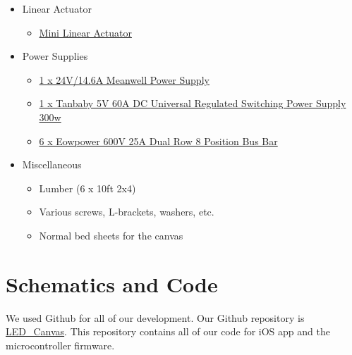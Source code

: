 \documentclass[11pt]{IEEEtran}
\begin{document}
\begin{itemize}
\item Linear Actuator
  \begin{itemize}
  \item \href{https://openbuildspartstore.com/micro-limit-switch-kit/}{Mini Linear Actuator}
  \end{itemize}

\item Power Supplies
  \begin{itemize}
  \item \href{https://openbuildspartstore.com/24v-14-6a-meanwell-power-supply/}{1 x 24V/14.6A Meanwell Power Supply}
  \item \href{https://www.amazon.com/Tanbaby-Universal-Regulated-Switching-Computer/dp/B017YEOAPA}{1 x Tanbaby 5V 60A DC Universal Regulated Switching Power Supply 300w}
  \item \href{https://www.amazon.com/gp/product/B06XKFCTSM/ref=oh_aui_detailpage_o05_s00?ie=UTF8&psc=1}{6 x Eowpower 600V 25A Dual Row 8 Position Bus Bar } 
  \end{itemize}

\item Miscellaneous
  \begin{itemize}
  \item Lumber (6 x 10ft 2x4)
  \item Various screws, L-brackets, washers, etc.
  \item Normal bed sheets for the canvas
  \end{itemize}
\end{itemize}

\section{Schematics and Code}
We used Github for all of our development. Our Github repository is \href{https://github.com/rajp20/LED_Canvas}{LED\_Canvas}. This repository contains all of our code for iOS app and the microcontroller firmware. 
\end{document}
